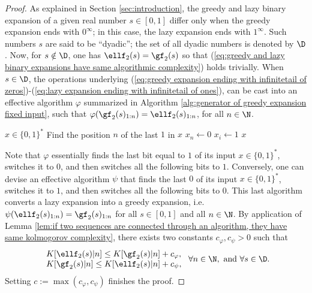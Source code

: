 \begin{proof}
As explained in Section \ref{sec:introduction}, the greedy and lazy binary expansion of a given real number $s \in [0,1]$ differ only when the greedy expansion ends with $0^\infty$; in this case, the lazy expansion ends with $1^\infty$. Such numbers $s$ are said to be ``dyadic''; the set of all dyadic numbers is denoted by $\D$. Now, for $s \notin \D$, one has $\ellf_2(s) = \gf_2(s)$ so that (\ref{eq:greedy and lazy binary expansions have same algorithmic complexity}) holds trivially. When $s \in \D$, the operations underlying (\ref{eq:greedy expansion ending with infinitetail of zeros})-(\ref{eq:lazy expansion ending with infinitetail of ones}), can be cast into an effective algorithm $\varphi$ summarized in Algorithm \ref{alg:generator of greedy expansion fixed input}, such that $\varphi(\gf_2(s)_{1: n}) = \ellf_2(s)_{1: n}$, for all $n \in \N$.
\begin{algorithm}
	\caption{Conversion from a greedy prefix to a lazy prefix}\label{alg:generator of greedy expansion fixed input}
	\begin{algorithmic}[1]
		\Require  $x \in \{0,1\}^\ast$
		\State Find the position $n$ of the last $1$ in $x$ 
		\State $x_n \gets 0$
		\State $x_i \gets 1$
		\EndFor
		\State \Return $x$
	\end{algorithmic}
	\end{algorithm}

Note that $\varphi$ essentially finds the last bit equal to $1$ of its input $x \in \{0,1\}^\ast$, switches it to $0$, and then switches all the following bits to $1$. Conversely, one can devise an effective algorithm $\psi$ that finds the last $0$ of its input $x \in \{0,1\}^\ast$, switches it to $1$, and then switches all the following bits to $0$. This last algorithm converts a lazy expansion into a greedy expansion, i.e. $\psi(\ellf_2(s)_{1: n}) = \gf_2(s)_{1: n}$ for all $s \in [0,1]$ and all $n \in \N$. By application of Lemma \ref{lem:if two sequences are connected through an algorithm, they have same kolmogorov complexity}, there exists two constants $c_\varphi,c_\psi > 0$ such that
\begin{equation}
	\begin{array}{l}
	K[\ellf_2(s) | n] \leq K[\gf_2(s)|n] + c_\varphi,\\
	K[\gf_2(s)|n] \leq K[\ellf_2(s)|n] + c_\psi,
	\end{array} \ \forall n \in \N, \ \text{and} \ \forall s \in \D.
\end{equation}
Setting $c := \max(c_\varphi, c_\psi)$ finishes the proof.
\end{proof}

